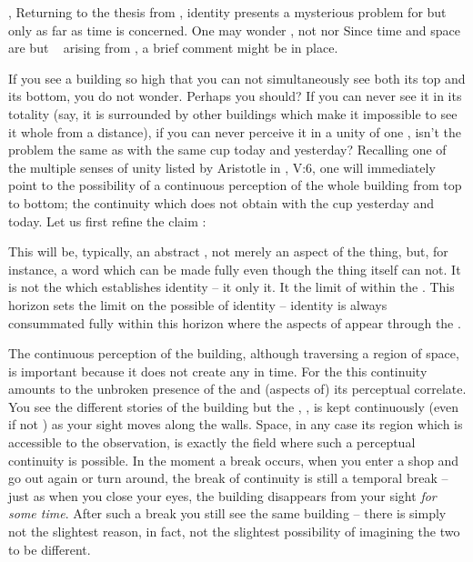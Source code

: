 \sep
%
Returning to the thesis from , identity presents a mysterious
problem for  but only as far as time is concerned. One may wonder
, not
 nor 
Since time and space are but \equi\  arising from
, a brief comment might be in place.

\pa If you see a building so high that you can not simultaneously see both its top and
its bottom, you do not wonder. Perhaps you should? If you can never see it in its
totality (say, it is surrounded by other buildings which make it impossible to
see it whole from a distance), if you can never perceive it in a unity of one
, isn't the problem the same as with the same cup today and yesterday?
Recalling one of the multiple senses of unity listed by Aristotle in
, V:6, one will immediately point to the possibility of a
continuous perception of the whole building from top to bottom; the continuity
which does not obtain with the cup yesterday and today. 
Let us first refine the claim : 
%
\label{th:idsign}

This  will be, typically, an abstract , not merely
an aspect of the thing, but, for instance, a word which can be made
fully  even though the thing itself can not.  It is not the
 which establishes identity -- it only  it. 
It  the  limit of  within
the \hoa. This horizon sets the limit on the possible  of
identity -- identity is always  consummated fully
within this horizon where the  aspects of  appear through the .

The continuous perception of the building, although traversing
a region of space, is important because it does not create any
 in time.  For the  this continuity
amounts to the unbroken presence of the  and (aspects of) its
perceptual correlate.  You see the different stories of the building but
the , , is kept continuously (even if not
) as your sight moves 
along the walls.  Space, in any case its region which is accessible
to the observation, is exactly the field where such a perceptual
continuity is possible.
In the moment a break occurs, when you enter a shop and go out again or turn
around, the break of continuity is still a temporal break -- just as when
you close your eyes, the building disappears from your sight {\em for some
  time}. After such a break you still see the same building -- there is simply
not the slightest reason, in fact, not the slightest possibility of imagining
the two to be different. 

